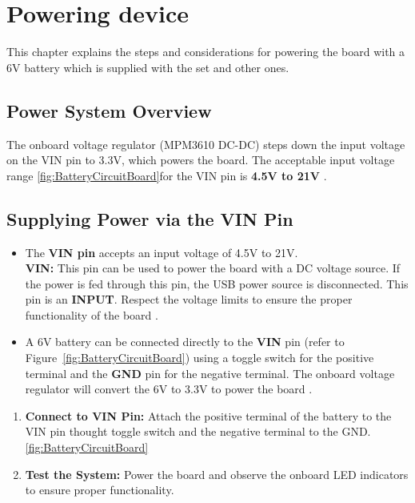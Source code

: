 \chapter{Powering device}

 This chapter explains the steps and considerations for powering the board with a 6V battery which is supplied with the set and other ones.

\section{Power System Overview}
The onboard voltage regulator (MPM3610 DC-DC) steps down the input voltage on the VIN pin to 3.3V, which powers the board. The acceptable input voltage range \ref{fig:BatteryCircuitBoard}for the VIN pin is \textbf{4.5V to 21V} .

\section{Supplying Power via the VIN Pin}
\begin{itemize}
    \item The \textbf{VIN pin} accepts an input voltage of 4.5V to 21V. \\
    \textbf{VIN:}  
    This pin can be used to power the board with a DC voltage source. If the power is fed through this pin, the USB power source is disconnected. This pin is an \textbf{INPUT}. Respect the voltage limits to ensure the proper functionality of the board .
    
    \item A 6V battery can be connected directly to the \textbf{VIN} pin (refer to Figure~\ref{fig:BatteryCircuitBoard}) using a toggle switch for the positive terminal and the \textbf{GND} pin for the negative terminal. The onboard voltage regulator will convert the 6V to 3.3V to power the board .
\end{itemize}



\begin{enumerate}

    \item \textbf{Connect to VIN Pin:} Attach the positive terminal of the battery to the VIN pin thought  toggle switch and the negative terminal to the GND.\ref{fig:BatteryCircuitBoard}
  
    \item \textbf{Test the System:} Power the board and observe the onboard LED indicators to ensure proper functionality.
\end{enumerate}






